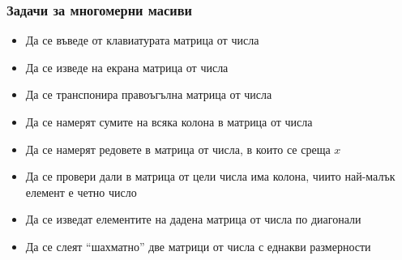 \documentclass{beamer}
\begin{document}
\begin{frame}
  \frametitle{Задачи за многомерни масиви}
  
  \begin{itemize}[<+->]
  \item Да се въведе от клавиатурата матрица от числа
  \item Да се изведе на екрана матрица от числа
  \item Да се транспонира правоъгълна матрица от числа
  \item Да се намерят сумите на всяка колона в матрица от числа
  \item Да се намерят редовете в матрица от числа, в които се среща $x$
  \item Да се провери дали в матрица от цели числа има колона, чиито най-малък елемент е четно число
  \item Да се изведат елементите на дадена матрица от числа по диагонали
  \item Да се слеят ``шахматно'' две матрици от числа с еднакви размерности
  \end{itemize}
\end{frame}
\end{document}
